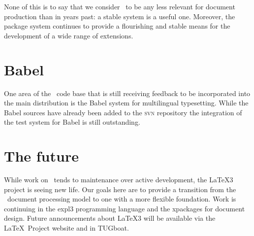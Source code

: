 \documentclass{ltnews}
\begin{document}
None of this is to say that we consider \LaTeXe\ to be any less
relevant for document production than in years past: a stable system
is a useful one.
Moreover, the package system continues to provide a flourishing and stable
means
for the development of a wide range of extensions.

\newpage

\section{Babel}

One area of the \LaTeXe\ code base that is still receiving feedback to
be incorporated into the main distribution is the Babel system for
multilingual typesetting.
While the Babel sources have already been added to the \textsc{svn} repository the
integration of the test system for Babel is still outstanding.


\section{The future}

While work on \LaTeXe\ tends to maintenance over active development,
the \LaTeX3 project is
seeing new life. Our goals here are to provide a transition from the
\LaTeXe\ document processing model to one with a more flexible
foundation. Work is continuing in the \textsf{expl3} programming
language and the \textsf{xpackages} for document design. Future
announcements
about \LaTeX3 will be available via the \LaTeX\ Project
website and in TUGboat.
\end{document}
